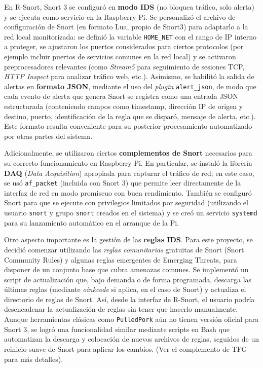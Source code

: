 \documentclass[11pt,a4paper,twoside]{report}
\begin{document}
En R-Snort, Snort 3 se configuró en \textbf{modo IDS} (no bloquea tráfico, solo alerta) y se ejecuta como servicio en la Raspberry Pi. Se personalizó el archivo de configuración de Snort (en formato Lua, propio de Snort3) para adaptarlo a la red local monitorizada: se definió la variable \texttt{HOME\_NET} con el rango de IP interno a proteger, se ajustaron los puertos considerados para ciertos protocolos (por ejemplo incluir puertos de servicios comunes en la red local) y se activaron preprocesadores relevantes (como \emph{Stream5} para seguimiento de sesiones TCP, \emph{HTTP Inspect} para analizar tráfico web, etc.). Asimismo, se habilitó la salida de alertas en \textbf{formato JSON}, mediante el uso del \emph{plugin} \texttt{alert\_json}, de modo que cada evento de alerta que genera Snort se registra como una entrada JSON estructurada (conteniendo campos como timestamp, dirección IP de origen y destino, puerto, identificación de la regla que se disparó, mensaje de alerta, etc.). Este formato resulta conveniente para su posterior procesamiento automatizado por otras partes del sistema.\newline

Adicionalmente, se utilizaron ciertos \textbf{complementos de Snort} necesarios para su correcto funcionamiento en Raspberry Pi. En particular, se instaló la librería \textbf{DAQ} (\emph{Data Acquisition}) apropiada para capturar el tráfico de red; en este caso, se usó \texttt{af\_packet} (incluida con Snort 3) que permite leer directamente de la interfaz de red en modo promiscuo con buen rendimiento. También se configuró Snort para que se ejecute con privilegios limitados por seguridad (utilizando el usuario \texttt{snort} y grupo \texttt{snort} creados en el sistema) y se creó un servicio \texttt{systemd} para su lanzamiento automático en el arranque de la Pi.\newline

Otro aspecto importante es la gestión de las \textbf{reglas IDS}. Para este proyecto, se decidió comenzar utilizando las \emph{reglas comunitarias} gratuitas de Snort (Snort Community Rules) y algunas reglas emergentes de Emerging Threats, para disponer de un conjunto base que cubra amenazas comunes. Se implementó un script de actualización que, bajo demanda o de forma programada, descarga las últimas reglas (mediante \emph{oinkcode} si aplica, en el caso de Snort) y actualiza el directorio de reglas de Snort. Así, desde la interfaz de R-Snort, el usuario podría desencadenar la actualización de reglas sin tener que hacerlo manualmente. Aunque herramientas clásicas como \texttt{PulledPork} aún no tienen versión oficial para Snort 3, se logró una funcionalidad similar mediante scripts en Bash que automatizan la descarga y colocación de nuevos archivos de reglas, seguidos de un reinicio suave de Snort para aplicar los cambios. (Ver el complemento de TFG para más detalles).\newline
\end{document}

